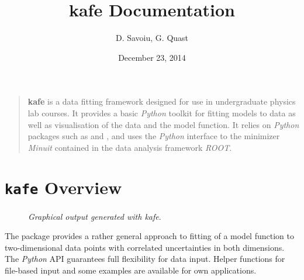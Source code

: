 \documentclass[a4paper,10pt,english]{sphinxmanual}
\title{kafe Documentation}
\date{December 23, 2014}
\author{D. Savoiu, G. Quast}
\begin{document}
\maketitle
\tableofcontents
{}\label{index::doc}

\begin{quote}

\textbf{kafe} is a data fitting framework designed for use in undergraduate
physics lab courses. It provides a basic \emph{Python} toolkit for fitting
models to data as well as visualisation of the data and the model function.
It relies on \emph{Python} packages such as  and ,
and uses the \emph{Python} interface to the minimizer \emph{Minuit} contained in the data
analysis framework \emph{ROOT}.
\end{quote}


\chapter{\texttt{kafe} Overview}
\label{index:welcome-to-kafe-karlsruhe-fit-environment}\label{index:kafe-overview}\begin{figure}[htbp]\begin{flushright}
\capstart

\caption{\emph{Graphical output generated with kafe}.}\end{flushright}\end{figure}

The  package provides a rather general approach to fitting of
a model function to two-dimensional data points with correlated uncertainties
in both dimensions. The \emph{Python} API guarantees full flexibility
for data input. Helper functions for file-based input and some
examples are available for own applications.
\end{document}
